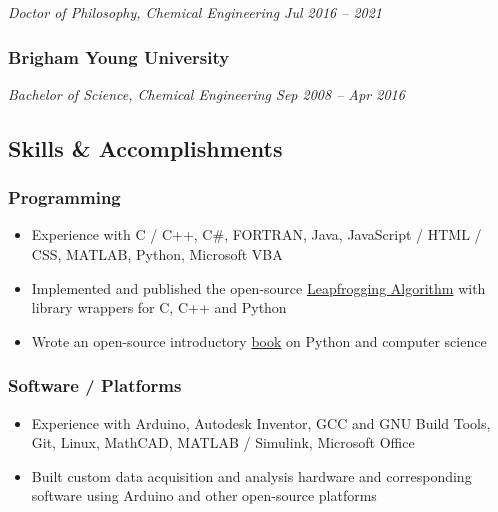 \emph{Doctor of Philosophy, Chemical Engineering \textbar{} Jul 2016 --
2021}

\hypertarget{brigham-young-university-1}{%
\subsubsection{Brigham Young
University}\label{brigham-young-university-1}}

\emph{Bachelor of Science, Chemical Engineering \textbar{} Sep 2008 --
Apr 2016}

\hypertarget{skills-accomplishments}{%
\subsection{Skills \& Accomplishments}\label{skills-accomplishments}}

\hypertarget{programming}{%
\subsubsection{Programming}\label{programming}}

\begin{itemize}
\tightlist
\item
  Experience with C / C++, C\#, FORTRAN, Java, JavaScript / HTML / CSS,
  MATLAB, Python, Microsoft VBA
\item
  Implemented and published the open-source
  \href{https://github.com/flythereddflagg/lpfgopt}{Leapfrogging
  Algorithm} with library wrappers for C, C++ and Python
\item
  Wrote an open-source introductory
  \href{https://flythereddflagg.github.io/python_book/site/index.html}{book}
  on Python and computer science
\end{itemize}

\hypertarget{software-platforms}{%
\subsubsection{Software / Platforms}\label{software-platforms}}

\begin{itemize}
\tightlist
\item
  Experience with Arduino, Autodesk Inventor, GCC and GNU Build Tools,
  Git, Linux, MathCAD, MATLAB / Simulink, Microsoft Office
\item
  Built custom data acquisition and analysis hardware and corresponding
  software using Arduino and other open-source platforms
\end{itemize}

